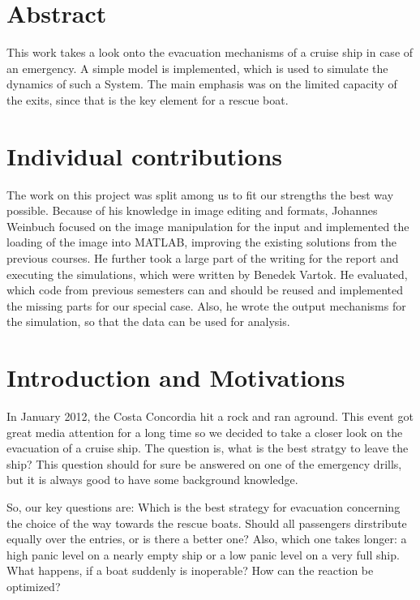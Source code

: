\documentclass[11pt]{article}
\begin{document}
\section{Abstract}

This work takes a look onto the evacuation mechanisms of a cruise ship in case of an emergency.
A simple model is implemented, which is used to simulate the dynamics of such a System. 
The main emphasis was on the limited capacity of the exits, since that is the key element for a
rescue boat. 


\section{Individual contributions}

The work on this project was split among us to fit our strengths the best way possible.
Because of his knowledge in image editing and formats, Johannes Weinbuch focused on the 
image manipulation for the input and implemented the loading of the image into MATLAB,
improving the existing solutions from the previous courses. He further took a large part of the writing for the report and executing the simulations, which were written by Benedek Vartok.
He evaluated, which code from previous semesters can and should be reused and implemented the missing parts for our special case. Also, he wrote the output mechanisms for the simulation, so that the data can be used for analysis.


\section{Introduction and Motivations}
In January 2012, the Costa Concordia hit a rock and ran aground\cite{bbcnews}.
This event got great media attention for a long time so we decided to take a closer look
on the evacuation of a cruise ship. The question is, what is the best stratgy to leave the ship?
This question should for sure be answered on one of the emergency drills, but it is always good 
to have some background knowledge.

So, our key questions are: Which is the best strategy for evacuation concerning the choice of the way towards the rescue boats. Should all passengers dirstribute equally over the entries, or is there a better one? Also, which one takes longer: a high panic level on a nearly empty ship or a low panic level on a very full ship. What happens, if a boat suddenly is inoperable? How can the reaction be optimized?
\end{document}
